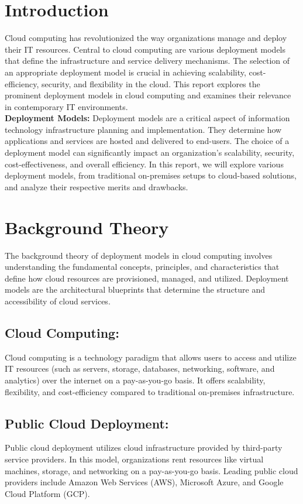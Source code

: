 \documentclass[12pt]{report}
\begin{document}
\section*{Introduction}
Cloud computing has revolutionized the way organizations manage and deploy their IT resources. Central to cloud computing are various deployment models that define the infrastructure and service delivery mechanisms. The selection of an appropriate deployment model is crucial in achieving scalability, cost-efficiency, security, and flexibility in the cloud. This report explores the prominent deployment models in cloud computing and examines their relevance in contemporary IT environments.\cite{introduction}
\textbf{\\Deployment Models:} Deployment models are a critical aspect of information technology infrastructure planning and implementation. They determine how applications and services are hosted and delivered to end-users. The choice of a deployment model can significantly impact an organization's scalability, security, cost-effectiveness, and overall efficiency. In this report, we will explore various deployment models, from traditional on-premises setups to cloud-based solutions, and analyze their respective merits and drawbacks.\cite{deploy}


\newpage
\section*{Background Theory}
The background theory of deployment models in cloud computing involves understanding the fundamental concepts, principles, and characteristics that define how cloud resources are provisioned, managed, and utilized. Deployment models are the architectural blueprints that determine the structure and accessibility of cloud services.\\
\subsection*{Cloud Computing:} Cloud computing is a technology paradigm that allows users to access and utilize IT resources (such as servers, storage, databases, networking, software, and analytics) over the internet on a pay-as-you-go basis. It offers scalability, flexibility, and cost-efficiency compared to traditional on-premises infrastructure.\cite{deploy}
\subsection*{Public Cloud Deployment:}
Public cloud deployment utilizes cloud infrastructure provided by third-party service providers. In this model, organizations rent resources like virtual machines, storage, and networking on a pay-as-you-go basis. Leading public cloud providers include Amazon Web Services (AWS), Microsoft Azure, and Google Cloud Platform (GCP).\cite{public}
\end{document}
